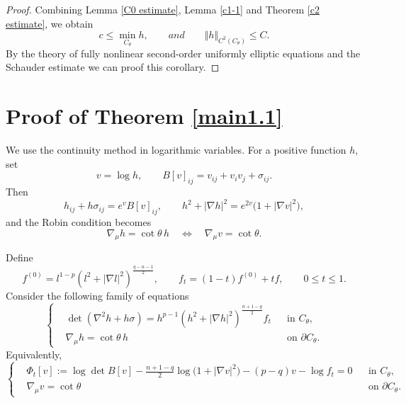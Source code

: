 \documentclass[11pt]{amsart}
\numberwithin{equation} {section}
\numberwithin{equation}{section}
\begin{document}
\begin{proof}
Combining Lemma \ref{C0 estimate}, Lemma \ref{c1-1} and Theorem \ref{c2 estimate}, we obtain
$$c\leq \min_{C_{\theta}}h, \qquad and \qquad \Vert h\Vert_{C^2(C_{\theta})}\leq C.$$
By the theory of fully nonlinear second-order uniformly elliptic equations and the Schauder estimate we can proof this corollary.

\end{proof}

 
\section{Proof of Theorem \ref{main1.1}} \label{se5}
We use the continuity method in logarithmic variables. For a positive function
$h$, set
\[
        v=\log h,\qquad
        B[v]_{ij}=v_{ij}+v_iv_j+\sigma_{ij}.
\]
Then
\[
        h_{ij}+h\sigma_{ij}=e^vB[v]_{ij},\qquad
        h^2+|\nabla h|^2=e^{2v}\bigl(1+|\nabla v|^2\bigr),
\]
and the Robin condition becomes
\[
        \nabla_{\mu}h=\cot\theta\,h
        \quad\Longleftrightarrow\quad
        \nabla_{\mu}v=\cot\theta.
\]

Define
\[
        f^{(0)}
        =l^{1-p}\left(l^2+|\nabla l|^2\right)^{\frac{q-n-1}{2}},
        \qquad
        f_t=(1-t)f^{(0)}+tf,\qquad 0\leq t\leq1.
\]
Consider the following family of equations
\[
\left\{
\begin{aligned}
&\det(\nabla^2h+h\sigma)
=h^{p-1}\left(h^2+|\nabla h|^2\right)^{\frac{n+1-q}{2}}f_t
&&\text{in }C_{\theta},\\
&\nabla_{\mu}h=\cot\theta\,h
&&\text{on }\partial C_{\theta}.
\end{aligned}
\right.
\]
Equivalently,
\begin{equation}\label{log path}
\left\{
\begin{aligned}
&\Phi_t[v]:=
\log\det B[v]
-\frac{n+1-q}{2}\log\bigl(1+|\nabla v|^2\bigr)
-(p-q)v-\log f_t=0
&&\text{in }C_{\theta},\\
&\nabla_{\mu}v=\cot\theta
&&\text{on }\partial C_{\theta}.
\end{aligned}
\right.
\end{equation}
\end{document}
